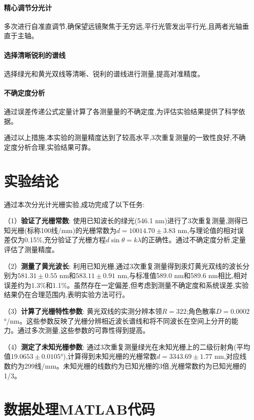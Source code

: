 ﻿\documentclass[12pt,a4paper]{article}
\begin{document}
\paragraph{精心调节分光计}多次进行自准直调节,确保望远镜聚焦于无穷远,平行光管发出平行光,且两者光轴垂直于主轴。

\paragraph{选择清晰锐利的谱线}选择绿光和黄光双线等清晰、锐利的谱线进行测量,提高对准精度。

\paragraph{不确定度分析}通过误差传递公式定量计算了各测量量的不确定度,为评估实验结果提供了科学依据。

通过以上措施,本实验的测量精度达到了较高水平,3次重复测量的一致性良好,不确定度分析合理,实验结果可靠。

\section{实验结论}

通过本次分光计光栅实验,成功完成了以下任务:

（1）\textbf{验证了光栅常数}: 使用已知波长的绿光(546.1 nm)进行了3次重复测量,测得已知光栅(标称100线/mm)的光栅常数为$d = 10014.70 \pm 3.83$ nm,与理论值的相对误差仅为0.15\%,充分验证了光栅方程$d \sin \theta = k \lambda$的正确性。通过不确定度分析,定量评估了测量精度。

（2）\textbf{测量了黄光波长}: 利用已知光栅,通过3次重复测量得到汞灯黄光双线的波长分别为$581.31 \pm 0.55$ nm和$583.11 \pm 0.91$ nm,与标准值589.0 nm和589.6 nm相比,相对误差约为1.3\%和1.1\%。虽然存在一定偏差,但考虑到测量不确定度和系统误差,实验结果仍在合理范围内,表明实验方法可行。

（3）\textbf{计算了光栅特性参数}: 黄光双线的实测分辨本领$R = 322$;角色散率$D = 0.0002$ °/nm。这些参数反映了光栅分辨相近波长谱线和将不同波长在空间上分开的能力。通过多次测量,这些参数的可靠性得到提高。

（4）\textbf{测定了未知光栅参数}: 通过3次重复测量绿光在未知光栅上的二级衍射角(平均值$19.0653 \pm 0.0105$°),计算得到未知光栅的光栅常数$d = 3343.69 \pm 1.77$ nm,对应线数约为299线/mm。未知光栅的线数约为已知光栅的3倍,光栅常数约为已知光栅的1/3。

\clearpage
\appendix

\section{数据处理MATLAB代码}
\end{document}
